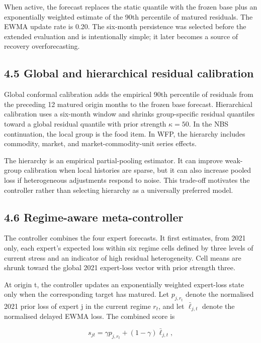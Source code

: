 When active, the forecast replaces the static quantile with the frozen
base plus an exponentially weighted estimate of the 90th percentile of
matured residuals. The EWMA update rate is 0.20. The six-month
persistence was selected before the extended evaluation and is
intentionally simple; it later becomes a source of recovery
overforecasting.

\subsection{4.5 Global and hierarchical residual
calibration}\label{global-and-hierarchical-residual-calibration}

Global conformal calibration adds the empirical 90th percentile of
residuals from the preceding 12 matured origin months to the frozen base
forecast. Hierarchical calibration uses a six-month window and shrinks
group-specific residual quantiles toward a global residual quantile with
prior strength \(\kappa=50\). In the NBS continuation, the local group
is the food item. In WFP, the hierarchy includes commodity, market, and
market-commodity-unit series effects.

The hierarchy is an empirical partial-pooling estimator. It can improve
weak-group calibration when local histories are sparse, but it can also
increase pooled loss if heterogeneous adjustments respond to noise. This
trade-off motivates the controller rather than selecting hierarchy as a
universally preferred model.

\subsection{4.6 Regime-aware
meta-controller}\label{regime-aware-meta-controller}

The controller combines the four expert forecasts. It first estimates,
from 2021 only, each expert's expected loss within six regime cells
defined by three levels of current stress and an indicator of high
residual heterogeneity. Cell means are shrunk toward the global 2021
expert-loss vector with prior strength three.

At origin t, the controller updates an exponentially weighted
expert-loss state only when the corresponding target has matured. Let
\(p_{j,r_t}\) denote the normalised 2021 prior loss of expert j in the
current regime \(r_t\), and let \(\bar\ell_{j,t}\) denote the normalised
delayed EWMA loss. The combined score is

\[
s_{jt}=\gamma p_{j,r_t}+(1-\gamma)\bar\ell_{j,t},
\]

